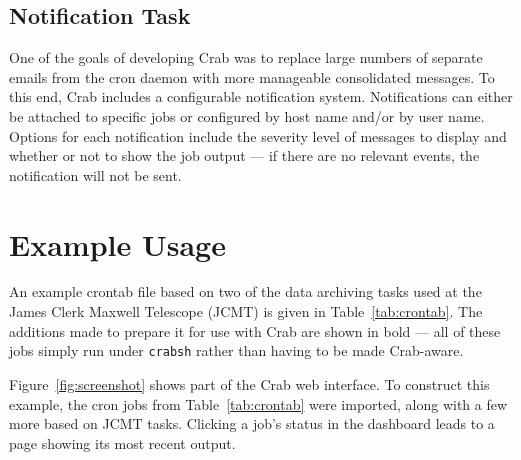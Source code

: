 \subsection{Notification Task}

One of the goals of developing Crab was to replace large numbers of separate emails from the cron daemon with more manageable consolidated messages. To this end, Crab includes a configurable notification system. Notifications can either be attached to specific jobs or configured by host name and/or by user name. Options for each notification include the severity level of messages to display and whether or not to show the job output --- if there are no relevant events, the notification will not be sent.

\section{Example Usage}

An example crontab file based on two of the data archiving tasks used at the James Clerk Maxwell Telescope (JCMT) is given in Table~\ref{tab:crontab}. The additions made to prepare it for use with Crab are shown in bold --- all of these jobs simply run under \texttt{crabsh} rather than having to be made Crab-aware.

Figure~\ref{fig:screenshot} shows part of the Crab web interface. To construct this example, the cron jobs from Table~\ref{tab:crontab} were imported, along with a few more based on JCMT tasks. Clicking a job's status in the dashboard leads to a page showing its most recent output.


